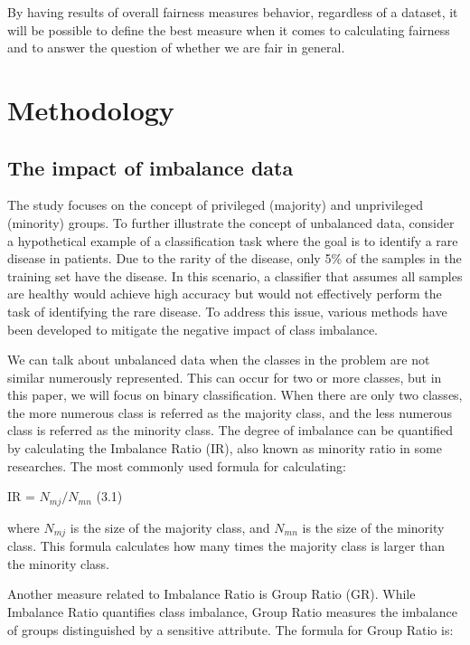 \documentclass[a4paper, 12pt]{article}
\begin{document}
By having results of overall fairness measures behavior, regardless of a dataset, it will be possible to define the best measure when it comes to calculating fairness and to answer the question of whether we are fair in general.

\bigbreak
\bigbreak
\section{Methodology}
\bigbreak
\subsection{The impact of imbalance data}
\large

The study focuses on the concept of privileged (majority) and unprivileged (minority) groups. To further illustrate the concept of unbalanced data, consider a hypothetical example of a classification task where the goal is to identify a rare disease in patients. Due to the rarity of the disease, only 5\% of the samples in the training set have the disease. In this scenario, a classifier that assumes all samples are healthy would achieve high accuracy but would not effectively perform the task of identifying the rare disease. To address this issue, various methods have been developed to mitigate the negative impact of class imbalance.

We can talk about unbalanced data when the classes in the problem are not similar numerously represented. This can occur for two or more classes, but in this paper, we will focus on binary classification. When there are only two classes, the more numerous class is referred as the majority class, and the less numerous class is referred as the minority class. The degree of imbalance can be quantified by calculating the Imbalance Ratio (IR), also known as minority ratio in some researches. The most commonly used formula for calculating:

\begin{center} \hfill IR = $N_{mj} / N_{mn}$ \hfill (3.1) \end{center}

where $N_{mj}$ is the size of the majority class, and $N_{mn}$ is the size of the minority class. This formula calculates how many times the majority class is larger than the minority class.

Another measure related to Imbalance Ratio is Group Ratio (GR). While Imbalance Ratio quantifies class imbalance, Group Ratio measures the imbalance of groups distinguished by a sensitive attribute. The formula for Group Ratio is:
\end{document}
